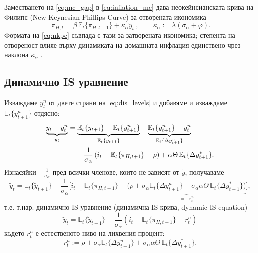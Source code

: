 Заместването на \eqref{eq:mc_gap} в \eqref{eq:inflation_mc} дава неокейнсианската крива на Филипс (New Keynesian Phillips Curve) за отворената икономика
\begin{equation}
\boxed{\ \pi_{H,t} = \beta\, \mathbb{E}_t\{ \pi_{H,t+1} \} + \kappa_\alpha \tilde{y}_t\ },
\qquad \kappa_\alpha := \lambda (\sigma_\alpha + \varphi).
\label{eq:nkpc}
\end{equation}
Формата на \eqref{eq:nkpc} съвпада с тази за затворената икономика; степента на отвореност влияе върху динамиката на домашната инфлация единствено чрез наклона $\kappa_\alpha$ \parencite[с.~164]{Gali2008}.

\subsection{Динамично IS уравнение}

Изваждаме $y^n_t$ от двете страни на \eqref{eq:dis_levels} и добавяме и изваждаме $\mathbb{E}_t\{y^n_{t+1}\}$ отдясно:
\begin{align}
\underbrace{y_t - y^n_t}_{\tilde{y}_t}
&= \underbrace{\mathbb{E}_t\{y_{t+1}\} - \mathbb{E}_t\{y^n_{t+1}\}}_{\mathbb{E}_t\{\tilde{y}_{t+1}\}}
+ \underbrace{\mathbb{E}_t\{y^n_{t+1}\} - y^n_t}_{\mathbb{E}_t\{\Delta y^n_{t+1}\}} \notag \\
&\quad - \frac{1}{\sigma_\alpha}\left( i_t - \mathbb{E}_t\{\pi_{H,t+1}\} - \rho \right)
+ \alpha\Theta\, \mathbb{E}_t\{ \Delta y^*_{t+1} \}.
\label{eq:dis_gap_raw}
\end{align}
Изнасяйки $-\frac{1}{\sigma_\alpha}$ пред всички членове, които не зависят от $\tilde{y}$, получаваме
\[
\tilde{y}_t = \mathbb{E}_t\{\tilde{y}_{t+1}\}
- \frac{1}{\sigma_\alpha}\Big[ i_t - \mathbb{E}_t\{\pi_{H,t+1}\}
- \underbrace{\big( \rho + \sigma_\alpha \mathbb{E}_t\{\Delta y^n_{t+1}\} + \sigma_\alpha\alpha\Theta\,\mathbb{E}_t\{\Delta y^*_{t+1}\} \big)}_{=: \ r^n_t} \Big],
\]
т.е. т.нар. динамично IS уравнение (динамична IS крива, dynamic IS equation)
\begin{equation}
\boxed{\ \tilde{y}_t = \mathbb{E}_t\{ \tilde{y}_{t+1} \} - \frac{1}{\sigma_\alpha} \left( i_t - \mathbb{E}_t\{ \pi_{H,t+1} \} - r^n_t \right)\ }
\label{eq:dis}
\end{equation}
където $r^n_t$ е естественото ниво на лихвения процент:
\begin{equation}
r^n_t := \rho + \sigma_\alpha \mathbb{E}_t\{\Delta y^n_{t+1}\} + \sigma_\alpha \alpha\Theta\, \mathbb{E}_t\{\Delta y^*_{t+1}\}.
\label{eq:rn_raw}
\end{equation}

